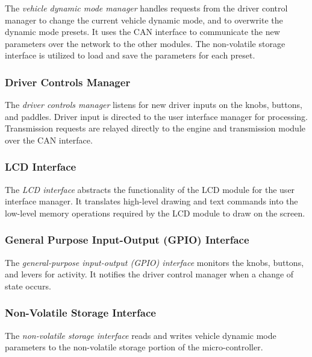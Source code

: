 The \emph{vehicle dynamic mode manager} handles requests from the driver control manager to change the current vehicle dynamic mode, and to overwrite the dynamic mode presets. It uses the CAN interface to communicate the new parameters over the network to the other modules. The non-volatile storage interface is utilized to load and save the parameters for each preset. 

\subsubsection{Driver Controls Manager}

The \emph{driver controls manager} listens for new driver inputs on the knobs, buttons, and paddles. Driver input is directed to the user interface manager for processing. Transmission requests are relayed directly to the engine and transmission module over the CAN interface.

\subsubsection{LCD Interface}

The \emph{LCD interface} abstracts the functionality of the LCD module for the user interface manager. It translates high-level drawing and text commands into the low-level memory operations required by the LCD module to draw on the screen.

\subsubsection{General Purpose Input-Output (GPIO) Interface}

The \emph{general-purpose input-output (GPIO) interface} monitors the knobs, buttons, and levers for activity. It notifies the driver control manager when a change of state occurs. 

\subsubsection{Non-Volatile Storage Interface}

The \emph{non-volatile storage interface} reads and writes vehicle dynamic mode parameters to the non-volatile storage portion of the micro-controller. 


